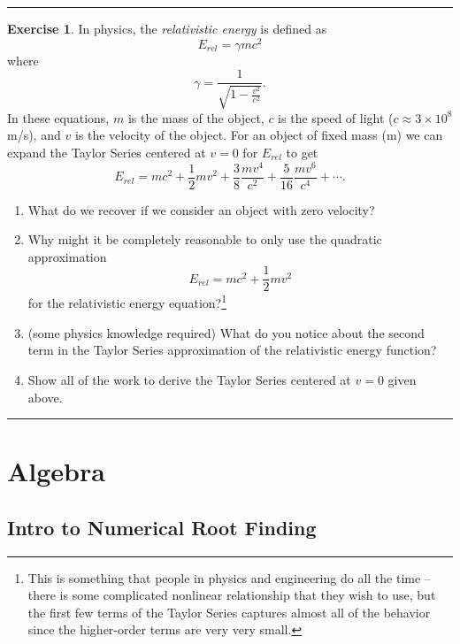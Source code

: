 \documentclass[
]{book}
\providecommand{\tightlist}{%
  \setlength{\itemsep}{0pt}\setlength{\parskip}{0pt}}
\theoremstyle{definition}
\theoremstyle{definition}
\theoremstyle{definition}
\newtheorem{exercise}{Exercise}[chapter]
\theoremstyle{remark}
\begin{document}
\begin{center}\rule{0.5\linewidth}{0.5pt}\end{center}

\begin{exercise}
\protect\hypertarget{exr:unnamed-chunk-69}{}{\label{exr:unnamed-chunk-69} }In physics, the \emph{relativistic energy} is defined as
\[ E_{rel} = \gamma mc^2 \]
where
\[ \gamma = \frac{1}{\sqrt{1 - \frac{v^2}{c^2}}}. \]
In these equations, \(m\) is the mass of the object, \(c\) is the speed of light (\(c \approx 3 \times 10^8\)m/s), and \(v\) is the velocity of the object. For an object of fixed mass (m) we can expand the Taylor Series centered at \(v=0\) for \(E_{rel}\) to get
\[ E_{rel} = mc^2 + \frac{1}{2} mv^2 + \frac{3}{8} \frac{mv^4}{c^2} + \frac{5}{16} \frac{mv^6}{c^4} + \cdots. \]

\begin{enumerate}
\def\labelenumi{\alph{enumi}.}
\tightlist
\item
  What do we recover if we consider an object with zero velocity?
\item
  Why might it be completely reasonable to only use the quadratic approximation
  \[ E_{rel} = mc^2 + \frac{1}{2} mv^2 \]
  for the relativistic energy equation?\footnote{This is something that people in physics and engineering do all the time -- there is some complicated nonlinear relationship that they wish to use, but the first few terms of the Taylor Series captures almost all of the behavior since the higher-order terms are very very small.}
\item
  (some physics knowledge required) What do you notice about the second term in the Taylor Series approximation of the relativistic energy function?
\item
  Show all of the work to derive the Taylor Series centered at \(v = 0\) given above.
\end{enumerate}
\end{exercise}

\begin{center}\rule{0.5\linewidth}{0.5pt}\end{center}

\hypertarget{ch:algebra}{%
\chapter{Algebra}\label{ch:algebra}}

\hypertarget{intro-to-numerical-root-finding}{%
\section{Intro to Numerical Root Finding}\label{intro-to-numerical-root-finding}}
\end{document}
